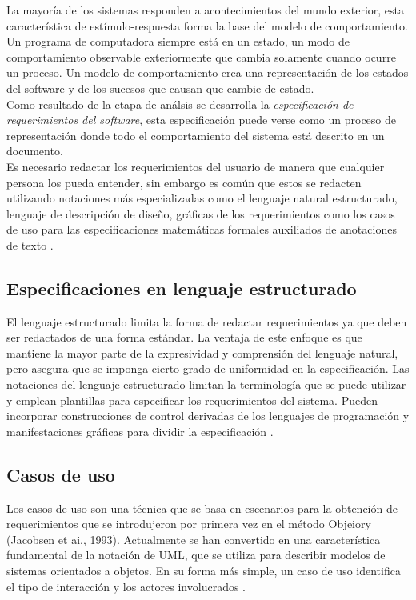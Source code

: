La mayoría de los sistemas responden a acontecimientos del mundo exterior, esta característica de estímulo-respuesta 
forma la base del modelo de comportamiento. Un programa de computadora siempre está en un estado, un modo de comportamiento observable
exteriormente que cambia solamente cuando ocurre un proceso. Un modelo de comportamiento crea una representación de los estados del
software y de los sucesos que causan que cambie de estado.\\

Como resultado de la etapa de análsis se desarrolla la \emph{especificación de requerimientos del software}, 
esta especificación puede verse como un proceso de representación donde todo el comportamiento del sistema está descrito en un documento.\\

Es necesario redactar los requerimientos del usuario de manera que cualquier persona los pueda entender, sin embargo es común que estos se redacten utilizando notaciones
más especializadas como el lenguaje natural estructurado, lenguaje de descripción de diseño, 
gráficas de los requerimientos como los casos de uso para las especificaciones matemáticas formales auxiliados de anotaciones de texto \cite{sommerville1992software}. 

\subsection{Especificaciones en lenguaje estructurado}
El lenguaje estructurado limita la forma de redactar requerimientos ya que deben ser redactados de una forma estándar. La ventaja de este enfoque es que
mantiene la mayor parte de la expresividad y comprensión del lenguaje natural, pero asegura
que se imponga cierto grado de uniformidad en la especificación. Las notaciones del lenguaje 
estructurado limitan la terminología que se puede utilizar y emplean plantillas para
especificar los requerimientos del sistema. Pueden incorporar construcciones de control
derivadas de los lenguajes de programación y manifestaciones gráficas para dividir la especificación \cite{sommerville1992software}.\\

\subsection{Casos de uso}
Los casos de uso son una técnica que se basa en escenarios para la obtención de requerimientos que se introdujeron 
por primera vez en el método Objeiory (Jacobsen et ai., 1993).
Actualmente se han convertido en una característica fundamental de la notación de UML, que
se utiliza para describir modelos de sistemas orientados a objetos. En su forma más simple,
un caso de uso identifica el tipo de interacción y los actores involucrados \cite{sommerville1992software}.\\

